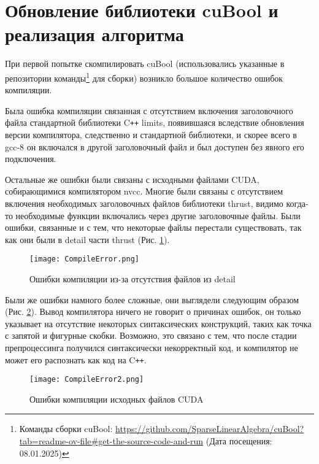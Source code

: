 
\section{Обновление библиотеки cuBool и реализация алгоритма}

При первой попытке скомпилировать cuBool (использовались указанные в репозитории команды\footnote{Команды сборки cuBool: \url{https://github.com/SparseLinearAlgebra/cuBool?tab=readme-ov-file\#get-the-source-code-and-run} (Дата посещения: 08.01.2025)} для сборки) возникло большое количество ошибок компиляции.

Была ошибка компиляции связанная с отсутствием включения заголовочного файла стандартной библиотеки C\texttt{++} limits, появившаяся вследствие обновления версии компилятора, следственно и стандартной библиотеки, и скорее всего в gcc-8 он включался в другой заголовочный файл и был доступен без явного его подключения.

Остальные же ошибки были связаны с исходными файлами CUDA, собирающимися компилятором nvcc.
Многие были связаны с отсутствием включения необходимых заголовочных файлов библиотеки thrust, видимо когда-то необходимые функции включались через другие заголовочные файлы. Были ошибки, связанные и с тем, что некоторые файлы перестали существовать, так как они были в detail части thrust (Рис. \ref{fig:CompilerError}).

\begin{figure}[H]
    \centering
    \texttt{[image: CompileError.png]}
    \caption{Ошибки компиляции из-за отсутствия файлов из detail}
    \label{fig:CompilerError}
\end{figure}

Были же ошибки намного более сложные, они выглядели следующим образом (Рис. \ref{fig:CompilerError2}). Вывод компилятора ничего не говорит о причинах ошибок, он только указывает на отсутствие некоторых синтаксических конструкций, таких как точка с запятой и фигурные скобки. Возможно, это связано с тем, что после стадии препроцессинга получился синтаксически некорректный код, и компилятор не может его распознать как код на C\texttt{++}.

\begin{figure}[H]
    \centering
    \texttt{[image: CompileError2.png]}
    \caption{Ошибки компиляции исходных файлов CUDA}
    \label{fig:CompilerError2}
\end{figure}

